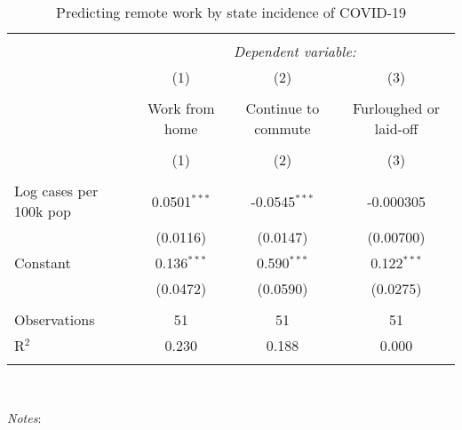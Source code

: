 
\begin{table}[!htbp] \centering 
  \caption{Predicting remote work by state incidence of COVID-19} 
  \label{tab:remotework} 
\small 
\begin{tabular}{@{\extracolsep{5pt}}lccc} 
\\[-1.8ex]\hline 
\hline \\[-1.8ex] 
 & \multicolumn{3}{c}{\textit{Dependent variable:}} \\ 
 \cline{2-4} 
 & (1) & (2) & (3) \\
 \\[-1.8ex] & Work from home & Continue to commute & Furloughed or laid-off \\ 
 \\[-1.8ex] & (1) & (2) & (3) \\ 
\hline \\[-1.8ex] 
Log cases per 100k pop & 0.0501$^{***}$ & -0.0545$^{***}$ & -0.000305 \\
 & (0.0116) & (0.0147) & (0.00700) \\
Constant & 0.136$^{***}$ & 0.590$^{***}$ & 0.122$^{***}$\\
 & (0.0472) & (0.0590) & (0.0275) \\
 &  &  &  \\
Observations & 51 & 51 & 51 \\
 R$^{2}$ & 0.230 & 0.188 & 0.000 \\ \hline
\hline 
\hline \\[-1.8ex] 
\end{tabular}
\\
\begin{minipage}{1.0 \textwidth}
{\footnotesize \emph{Notes}: 
\starlanguage}
\end{minipage}
\end{table}
